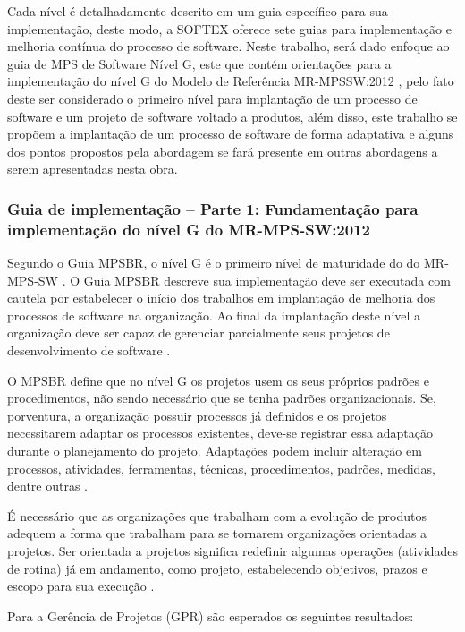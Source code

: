 \documentclass{acm_proc_article-sp}
\begin{document}
Cada nível é detalhadamente descrito em um guia específico para sua implementação, deste modo, a SOFTEX oferece sete guias para implementação e melhoria contínua do processo de software. Neste trabalho, será dado enfoque ao guia de MPS de Software Nível G, este que contém orientações para a implementação do nível G do Modelo de Referência MR-MPSSW:2012  \cite{mpsbr:nAgil}, pelo fato deste ser considerado o primeiro nível para implantação de um processo de software e um projeto de software voltado a produtos, além disso, este trabalho se propõem a implantação de um processo de software de forma adaptativa e alguns dos pontos propostos pela abordagem se fará presente em outras abordagens a serem apresentadas nesta obra.  

\subsubsection*{Guia de implementação – Parte 1: Fundamentação para implementação do nível G do MR-MPS-SW:2012}
Segundo o Guia MPSBR, o nível G é o primeiro nível de maturidade do do MR-MPS-SW \cite{mpsbr:nAgil}. O Guia MPSBR descreve sua implementação deve ser executada com cautela por estabelecer o início dos trabalhos em implantação de melhoria dos processos de software na organização. Ao final da implantação deste nível a organização deve ser capaz de gerenciar parcialmente seus projetos de desenvolvimento de software \cite{mpsbr:nAgil}.

O MPSBR define que no nível G os projetos usem os seus próprios padrões e procedimentos, não
sendo necessário que se tenha padrões organizacionais. Se, porventura, a organização possuir processos já definidos e os projetos necessitarem adaptar os processos existentes, deve-se registrar essa adaptação durante o planejamento do projeto. Adaptações podem incluir alteração em processos, atividades, ferramentas, técnicas, procedimentos, padrões, medidas, dentre outras \cite{mpsbr:nAgil}.

É necessário que as organizações que trabalham com a evolução de produtos adequem a forma que trabalham para se tornarem organizações orientadas a projetos. Ser orientada a projetos significa redefinir algumas operações (atividades
de rotina) já em andamento, como projeto, estabelecendo objetivos, prazos e escopo
para sua execução \cite{mpsbr:nAgil}.

Para a Gerência de Projetos (GPR) são esperados os seguintes resultados:
\end{document}
